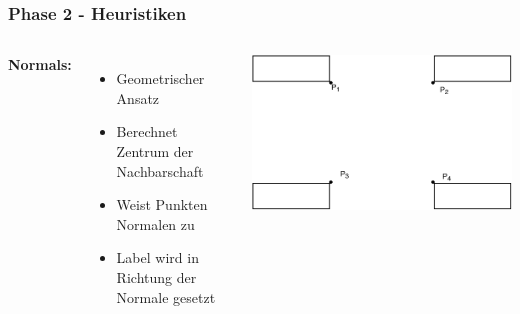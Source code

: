 \documentclass[aspectratio=169]{beamer}
\begin{document}
\begin{frame}
	\frametitle{Phase 2 - Heuristiken}
	\begin{columns}[c] %
		
		\textbf{Normals:}
		\begin{itemize}
			\item Geometrischer Ansatz
			\item Berechnet Zentrum der Nachbarschaft
			\item Weist Punkten Normalen zu
			\item Label wird in Richtung der Normale gesetzt
			
		\end{itemize}
		
		\includegraphics[scale=.6]{normal_finished.pdf}
		
		
		
	\end{columns}
	\end{frame}
	
\end{document}
